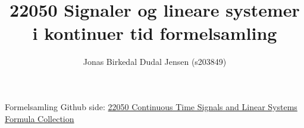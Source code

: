 \documentclass{article}
\title{22050 Signaler og lineare systemer i kontinuer tid formelsamling}
\date{}
\author{Jonas Birkedal Dudal Jensen (s203849)}
\begin{document}
	\maketitle
	\begin{center}
		Formelsamling Github side: \href{https://github.com/jondalnas/22050-Continuous-Time-Signals-and-Linear-Systems-Formula-Collection}{22050 Continuous Time Signals and Linear Systems Formula Collection}
	\end{center}
\end{document}
